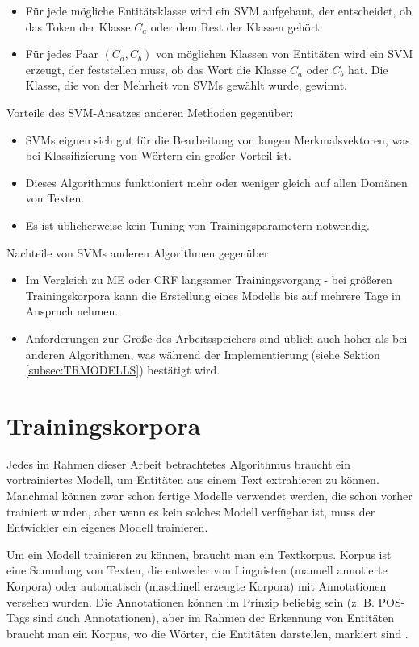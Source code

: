 \begin{itemize}
\item Für jede mögliche Entitätsklasse wird ein SVM aufgebaut, der entscheidet, ob das Token der Klasse $C_a$ oder dem Rest der Klassen gehört.
\item Für jedes Paar $(C_a, C_b)$ von möglichen Klassen von Entitäten wird ein SVM erzeugt, der feststellen muss, ob das Wort die Klasse $C_a$ oder $C_b$ hat. Die Klasse, die von der Mehrheit von SVMs gewählt wurde, gewinnt.
\end{itemize}

Vorteile des SVM-Ansatzes anderen Methoden gegenüber\cite{joachims1998text}:
\begin{itemize}
\item SVMs eignen sich gut für die Bearbeitung von langen Merkmalsvektoren, was bei Klassifizierung von Wörtern ein großer Vorteil ist.
\item Dieses Algorithmus funktioniert mehr oder weniger gleich auf allen Domänen von Texten.
\item Es ist üblicherweise kein Tuning von Trainingsparametern notwendig.
\end{itemize}

Nachteile von SVMs anderen Algorithmen gegenüber:
\begin{itemize}
\item Im Vergleich zu ME oder CRF langsamer Trainingsvorgang - bei größeren Trainingskorpora kann die Erstellung eines Modells bis auf mehrere Tage in Anspruch nehmen.
\item Anforderungen zur Größe des Arbeitsspeichers sind üblich auch höher als bei anderen Algorithmen, was während der Implementierung (siehe Sektion \ref{subsec:TRMODELLS}) bestätigt wird.
\end{itemize}

\section{Trainingskorpora} \label{sec:trcorpora}
Jedes im Rahmen dieser Arbeit betrachtetes Algorithmus braucht ein vortrainiertes Modell, um Entitäten aus einem Text extrahieren zu können. Manchmal können zwar schon fertige Modelle verwendet werden, die schon vorher trainiert wurden, aber wenn es kein solches Modell verfügbar ist, muss der Entwickler ein eigenes Modell trainieren.

Um ein Modell trainieren zu können, braucht man ein Textkorpus. Korpus ist eine Sammlung von Texten, die entweder von Linguisten (manuell annotierte Korpora) oder automatisch (maschinell erzeugte Korpora) mit Annotationen versehen wurden. Die Annotationen können im Prinzip beliebig sein (z. B. POS-Tags sind auch Annotationen), aber im Rahmen der Erkennung von Entitäten braucht man ein Korpus, wo die Wörter, die Entitäten darstellen, markiert sind \cite{naf2006korpuslinguistik}.

